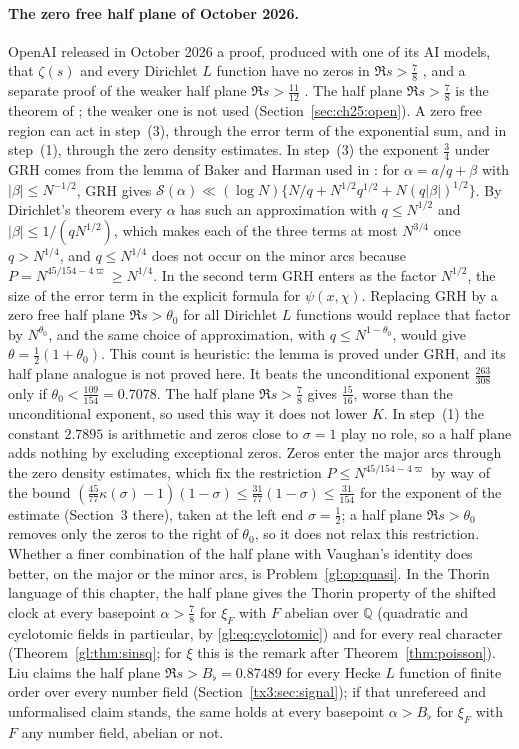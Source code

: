 \paragraph{The zero free half plane of October 2026.} OpenAI released in October 2026 a proof, produced with one of its AI models, that $\zeta(s)$ and every Dirichlet $L$ function have no zeros in $\Re s>\tfrac78$ \cite{OAI26a}, and a separate proof of the weaker half plane $\Re s>\tfrac{11}{12}$ \cite{OAI26b}. The half plane $\Re s>\tfrac78$ is the theorem of \cite{OAI26a}; the weaker one is not used (Section~\ref{sec:ch25:open}). A zero free region can act in step~(3), through the error term of the exponential sum, and in step~(1), through the zero density estimates. In step~(3) the exponent $\tfrac34$ under GRH comes from the lemma of Baker and Harman used in \cite{HBP02}: for $\alpha=a/q+\beta$ with $|\beta|\le N^{-1/2}$, GRH gives $\mathcal S(\alpha)\ll(\log N)\{N/q+N^{1/2}q^{1/2}+N(q|\beta|)^{1/2}\}$. By Dirichlet's theorem every $\alpha$ has such an approximation with $q\le N^{1/2}$ and $|\beta|\le1/(qN^{1/2})$, which makes each of the three terms at most $N^{3/4}$ once $q>N^{1/4}$, and $q\le N^{1/4}$ does not occur on the minor arcs because $P=N^{45/154-4\varpi}\ge N^{1/4}$. In the second term GRH enters as the factor $N^{1/2}$, the size of the error term in the explicit formula for $\psi(x,\chi)$. Replacing GRH by a zero free half plane $\Re s>\theta_0$ for all Dirichlet $L$ functions would replace that factor by $N^{\theta_0}$, and the same choice of approximation, with $q\le N^{1-\theta_0}$, would give $\theta=\tfrac12(1+\theta_0)$. This count is heuristic: the lemma is proved under GRH, and its half plane analogue is not proved here. It beats the unconditional exponent $\tfrac{263}{308}$ only if $\theta_0<\tfrac{109}{154}=0.7078$. The half plane $\Re s>\tfrac78$ gives $\tfrac{15}{16}$, worse than the unconditional exponent, so used this way it does not lower $K$. In step~(1) the constant $2.7895$ is arithmetic and zeros close to $\sigma=1$ play no role, so a half plane adds nothing by excluding exceptional zeros. Zeros enter the major arcs through the zero density estimates, which fix the restriction $P\le N^{45/154-4\varpi}$ by way of the bound $(\tfrac{45}{77}\kappa(\sigma)-1)(1-\sigma)\le\tfrac{31}{77}(1-\sigma)\le\tfrac{31}{154}$ for the exponent of the estimate (Section~3 there), taken at the left end $\sigma=\tfrac12$; a half plane $\Re s>\theta_0$ removes only the zeros to the right of $\theta_0$, so it does not relax this restriction. Whether a finer combination of the half plane with Vaughan's identity does better, on the major or the minor arcs, is Problem~\ref{gl:op:quasi}. In the Thorin language of this chapter, the half plane gives the Thorin property of the shifted clock at every basepoint $\alpha>\tfrac78$ for $\xi_F$ with $F$ abelian over $\mathbb Q$ (quadratic and cyclotomic fields in particular, by \eqref{gl:eq:cyclotomic}) and for every real character (Theorem~\ref{gl:thm:sinsq}; for $\xi$ this is the remark after Theorem~\ref{thm:poisson}). Liu \cite{Liu26b} claims the half plane $\Re s>B_\flat=0.87489$ for every Hecke $L$ function of finite order over every number field (Section~\ref{tx3:sec:signal}); if that unrefereed and unformalised claim stands, the same holds at every basepoint $\alpha>B_\flat$ for $\xi_F$ with $F$ any number field, abelian or not.
